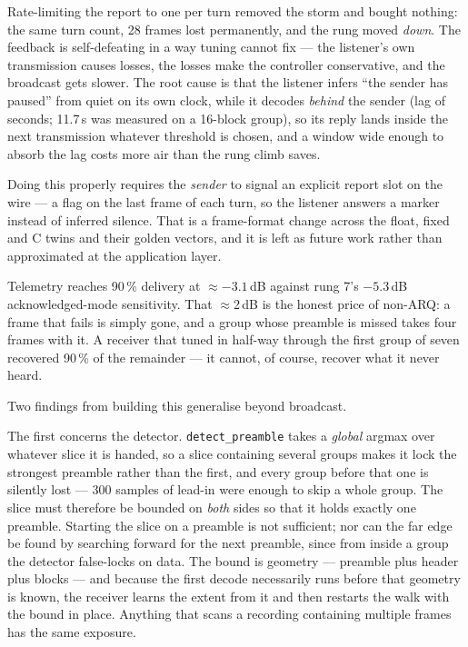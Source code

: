 Rate-limiting the report to one per turn removed the storm and bought
nothing: the same turn count, 28 frames lost permanently, and the rung
moved \emph{down}.  The feedback is self-defeating in a way tuning
cannot fix --- the listener's own transmission causes losses, the
losses make the controller conservative, and the broadcast gets slower.
The root cause is that the listener infers ``the sender has paused''
from quiet on its own clock, while it decodes \emph{behind} the sender
(lag of seconds; 11.7\,s was measured on a 16-block group), so its
reply lands inside the next transmission whatever threshold is chosen,
and a window wide enough to absorb the lag costs more air than the rung
climb saves.

Doing this properly requires the \emph{sender} to signal an explicit
report slot on the wire --- a flag on the last frame of each turn, so
the listener answers a marker instead of inferred silence.  That is a
frame-format change across the float, fixed and C twins and their
golden vectors, and it is left as future work rather than approximated
at the application layer.

Telemetry reaches 90\,\% delivery at $\approx-3.1$\,dB against rung 7's
$-5.3$\,dB acknowledged-mode sensitivity.  That $\approx$2\,dB is the
honest price of non-ARQ: a frame that fails is simply gone, and a group
whose preamble is missed takes four frames with it.  A receiver that
tuned in half-way through the first group of seven recovered 90\,\% of
the remainder --- it cannot, of course, recover what it never heard.

Two findings from building this generalise beyond broadcast.

The first concerns the detector.  \texttt{detect\_preamble} takes a
\emph{global} argmax over whatever slice it is handed, so a slice
containing several groups makes it lock the strongest preamble rather
than the first, and every group before that one is silently lost --- 300
samples of lead-in were enough to skip a whole group.  The slice must
therefore be bounded on \emph{both} sides so that it holds exactly one
preamble.  Starting the slice on a preamble is not sufficient; nor can
the far edge be found by searching forward for the next preamble, since
from inside a group the detector false-locks on data.  The bound is
geometry --- preamble plus header plus blocks --- and because the first
decode necessarily runs before that geometry is known, the receiver
learns the extent from it and then restarts the walk with the bound in
place.  Anything that scans a recording containing multiple frames has
the same exposure.

